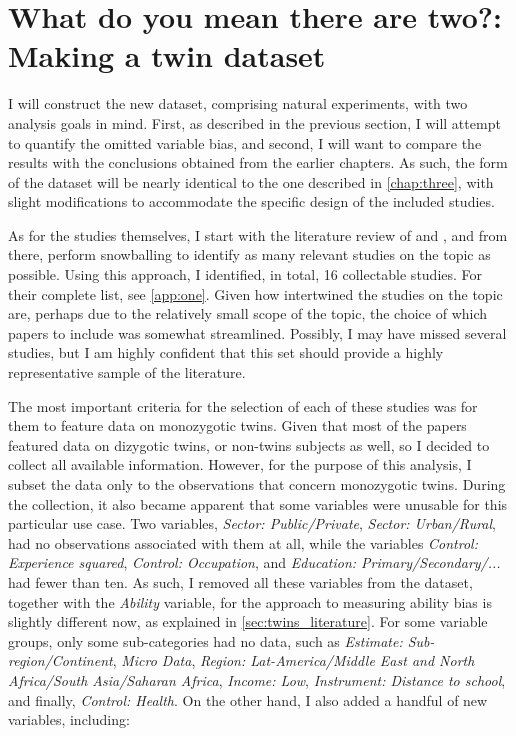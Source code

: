 \section{What do you mean there are two?: Making a twin dataset}
\label{sec:twins_data}

I will construct the new dataset, comprising natural experiments, with two analysis goals in mind. First, as described in the previous section, I will attempt to quantify the omitted variable bias, and second, I will want to compare the results with the conclusions obtained from the earlier chapters. As such, the form of the dataset will be nearly identical to the one described in \autoref{chap:three}, with slight modifications to accommodate the specific design of the included studies.

As for the studies themselves, I start with the literature review of \cite{nakamuro2012estimating} and \cite{li2012estimating}, and from there, perform snowballing to identify as many relevant studies on the topic as possible. Using this approach, I identified, in total, 16 collectable studies. For their complete list, see \autoref{app:one}.  Given how intertwined the studies on the topic are, perhaps due to the relatively small scope of the topic, the choice of which papers to include was somewhat streamlined. Possibly, I may have missed several studies, but I am highly confident that this set should provide a highly representative sample of the literature.

The most important criteria for the selection of each of these studies was for them to feature data on monozygotic twins. Given that most of the papers featured data on dizygotic twins, or non-twins subjects as well, so I decided to collect all available information. However, for the purpose of this analysis, I subset the data only to the observations that concern monozygotic twins. During the collection, it also became apparent that some variables were unusable for this particular use case. Two variables, \textit{Sector: Public/Private}, \textit{Sector: Urban/Rural}, had no observations associated with them at all, while the variables \textit{Control: Experience squared}, \textit{Control: Occupation}, and \textit{Education: Primary/Secondary/...} had fewer than ten. As such, I removed all these variables from the dataset, together with the \textit{Ability} variable, for the approach to measuring ability bias is slightly different now, as explained in \autoref{sec:twins_literature}. For some variable groups, only some sub-categories had no data, such as \textit{Estimate: Sub-region/Continent}, \textit{Micro Data}, \textit{Region: Lat-America/Middle East and North Africa/South Asia/Saharan Africa}, \textit{Income: Low}, \textit{Instrument: Distance to school}, and finally, \textit{Control: Health}. On the other hand, I also added a handful of new variables, including:

